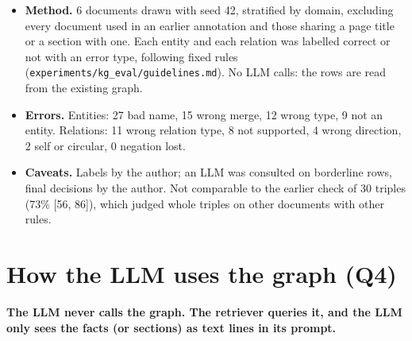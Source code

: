 \documentclass[11pt,a4paper]{article}
\begin{document}
\begin{itemize}
\item \textbf{Method.} 6 documents drawn with seed 42, stratified by domain, excluding every document used in an
  earlier annotation and those sharing a page title or a section with one. Each entity and each relation was
  labelled correct or not with an error type, following fixed rules (\texttt{experiments/kg\_eval/guidelines.md}).
  No LLM calls: the rows are read from the existing graph.
\item \textbf{Errors.} Entities: 27 bad name, 15 wrong merge, 12 wrong type, 9 not an entity. Relations: 11 wrong
  relation type, 8 not supported, 4 wrong direction, 2 self or circular, 0 negation lost.
\item \textbf{Caveats.} Labels by the author; an LLM was consulted on borderline rows, final decisions by the
  author. Not comparable to the earlier check of 30 triples (73\% [56, 86]), which judged whole triples on other
  documents with other rules.
\end{itemize}

\section{How the LLM uses the graph (Q4)}\label{sec:usage}

\textbf{The LLM never calls the graph. The retriever queries it, and the LLM only sees the facts
(or sections) as text lines in its prompt.}
\end{document}
